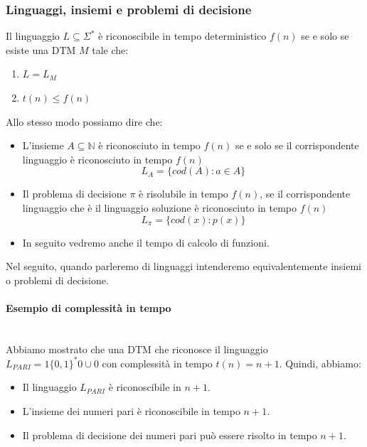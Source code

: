 \documentclass{article}
\begin{document}
\subsubsection{Linguaggi, insiemi e problemi di decisione}
Il linguaggio $L\subseteq \Sigma^*$ è riconoscibile in tempo
deterministico $f(n)$ se e solo se esiste una DTM $M$ tale che:
\begin{enumerate}
    \item $L=L_M$
    \item $t(n)\leq f(n)$
\end{enumerate}
Allo stesso modo possiamo dire che:
\begin{itemize}
    \item L'insieme $A\subseteq\mathbb{N}$ è riconosciuto in tempo $f(n)$
    se e solo se il corrispondente linguaggio è riconosciuto in tempo $f(n)$
    $$L_A=\{cod(A):a\in A\}$$
    \item Il problema di decisione $\pi$ è risolubile in tempo $f(n)$, se
    il corrispondente linguaggio che è il linguaggio soluzione è riconosciuto
    in tempo $f(n)$
    $$L_\pi=\{cod(x):p(x)\}$$
    \item In seguito vedremo anche il tempo di calcolo di funzioni.
\end{itemize}
Nel seguito, quando parleremo di linguaggi intenderemo equivalentemente insiemi
o problemi di decisione.

\paragraph{Esempio di complessità in tempo}\mbox{}\\
Abbiamo mostrato che una DTM che riconosce il linguaggio $L_{PARI}=1\{0,1\}^*0\cup0$
con complessità in tempo $t(n)=n+1$. Quindi, abbiamo:
\begin{itemize}
    \item Il linguaggio $L_{PARI}$ è riconoscibile in $n+1$.
    \item L'insieme dei numeri pari è riconoscibile in tempo $n+1$.
    \item Il problema di decisione dei numeri pari può essere risolto
    in tempo $n+1$.
\end{itemize}
\end{document}
